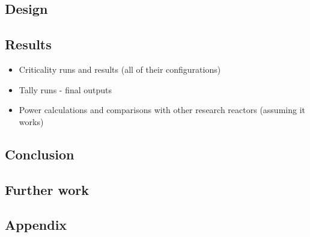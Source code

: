 \documentclass[12pt,a4paper]{article}
\begin{document}
\subsection{Design}
\subsection{Results}
\begin{itemize}
	\item Criticality runs and results (all of their configurations)
	\item Tally runs - final outputs
	\item Power calculations and comparisons with other research reactors (assuming it works)
\end{itemize}
\subsection{Conclusion}
\subsection{Further work}
\subsection{Appendix}
\end{document}
